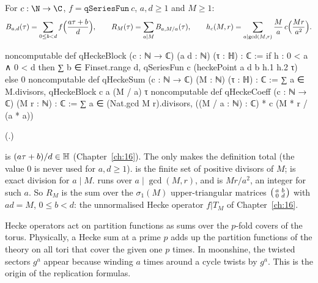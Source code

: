 \begin{definition}\label{ch19:def:qhecke}
For $c:\N\to\C$, $f=\mathtt{qSeriesFun}\ c$, $a,d\ge1$ and $M\ge1$:
\begin{equation*}
  B_{a,d}(\tau)=\sum_{0\le b<d}f\Bigl(\frac{a\tau+b}d\Bigr),\qquad R_M(\tau)=\sum_{a\mid M}B_{a,M/a}(\tau),\qquad
  h_c(M,r)=\sum_{a\mid\gcd(M,r)}\frac Ma\,c\Bigl(\frac{Mr}{a^2}\Bigr).
\end{equation*}
\end{definition}
\begin{leancode}
noncomputable def qHeckeBlock (c : ℕ → ℂ) (a d : ℕ) (τ : ℍ) : ℂ :=
  if h : 0 < a ∧ 0 < d then
    ∑ b ∈ Finset.range d, qSeriesFun c (heckePoint a d b h.1 h.2 τ)
  else 0
noncomputable def qHeckeSum (c : ℕ → ℂ) (M : ℕ) (τ : ℍ) : ℂ :=
  ∑ a ∈ M.divisors, qHeckeBlock c a (M / a) τ
noncomputable def qHeckeCoeff (c : ℕ → ℂ) (M r : ℕ) : ℂ :=
  ∑ a ∈ (Nat.gcd M r).divisors, ((M / a : ℕ) : ℂ) * c (M * r / (a * a))
\end{leancode}
(.)
\begin{dictionary}
 is $(a\tau+b)/d\in\mathbb{H}$ (Chapter~\ref{ch:16}).  The 
only makes the definition total (the value $0$ is never used for $a,d\ge1$).   is the finite set of
positive divisors of $M$;  is exact division for $a\mid M$.   runs over
$a\mid\gcd(M,r)$, and  is $Mr/a^2$, an integer for such $a$.  So $R_M$ is the sum over the
$\sigma_1(M)$ upper-triangular matrices $\left(\begin{smallmatrix}a&b\\0&d\end{smallmatrix}\right)$ with $ad=M$, $0\le b<d$: the unnormalised Hecke operator
$f|T_M$ of Chapter~\ref{ch:16}.
\end{dictionary}

\begin{physics}
Hecke operators act on partition functions as sums over the $p$-fold covers of the torus. Physically, a Hecke sum at
a prime $p$ adds up the partition functions of the theory on all tori that cover the given one $p$ times. In
moonshine, the twisted sectors $g^a$ appear because winding $a$ times around a cycle twists by $g^a$. This is the
origin of the replication formulas.
\end{physics}


